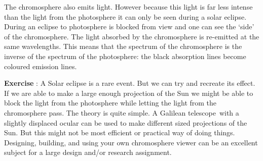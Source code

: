 \documentclass[12pt,a4paper]{article}
\numberwithin{equation}{section}
\numberwithin{figure}{section}
\newcounter{Exercise}
\numberwithin{table}{section}
\begin{document}
The chromosphere also emits light. However because this light is far less intense than the light from the photosphere it can only be seen during a solar eclipse. During an eclipse to photosphere is blocked from view and one can see the `side' of the chromosphere. The light absorbed by the chromosphere  is re-emitted at the same wavelengths. This means that the spectrum of the chromosphere is the inverse of the spectrum of the photosphere: the black absorption lines become coloured emission lines.

\begin{shaded}
\textbf{Exercise \theExercise {}} : A Solar eclipse is a rare event. But we can try and recreate its effect. If we are able to make a large enough projection of the Sun we might be able to block the light from the photosphere while letting the light from the chromosphere pass. The theory is quite simple. A Galilean telescope\footnotemark ~with a slightly displaced ocular can be used to make different sized projections of the Sun. But this might not be most efficient or practical way of doing things. Designing, building, and using your own chromosphere viewer can be an excellent subject for a large design and/or research assignment.\end{shaded}
\end{document}
